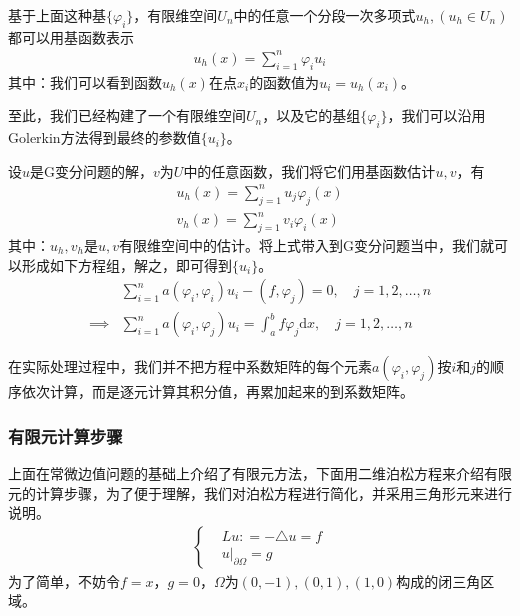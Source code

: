             \par
            基于上面这种基$\{\varphi _i\}$，有限维空间$U_n$中的任意一个分段一次多项式$u_h,(u_h \in U_n)$都可以用基函数表示
            \begin{align*}
                u_h(x) = \sum _{i = 1}^n \varphi_i u_i
            \end{align*}
            其中：我们可以看到函数$u_h(x)$在点$x_i$的函数值为$u_i = u_h(x_i)$。
            \par
            至此，我们已经构建了一个有限维空间$U_n$，以及它的基组$\{\varphi _i\}$，我们可以沿用Golerkin方法得到最终的参数值$\{u _i\}$。
            \par
            设$u$是G变分问题的解，$v$为$U$中的任意函数，我们将它们用基函数估计$u,v$，有
            \begin{align*}
                u_h(x) = \sum_{j = 1}^n u_j \varphi_j(x)\\
                v_h(x) = \sum_{j = 1}^n v_i \varphi_i(x)
            \end{align*}
            其中：$u_h,v_h$是$u,v$有限维空间中的估计。将上式带入到G变分问题当中，我们就可以形成如下方程组，解之，即可得到$\{u _i\}$。
            \begin{align*}
                            &\sum_{i = 1}^n a(\varphi_i,\varphi_i)u_i - (f,\varphi_j) = 0 ,\quad j = 1,2,\dots,n\\
                \implies {} &\sum_{i = 1}^n a(\varphi_i,\varphi_j)u_i = \int_a^bf \varphi_j \mathrm{d}x ,\quad j = 1,2,\dots,n
            \end{align*}
            \par
            在实际处理过程中，我们并不把方程中系数矩阵的每个元素$a(\varphi_i, \varphi_j)$按$i$和$j$的顺序依次计算，而是逐元计算其积分值，再累加起来的到系数矩阵。


        \subsubsection{有限元计算步骤}
            \label{subsubsec:有限元计算步骤}
            上面在常微边值问题的基础上介绍了有限元方法，下面用二维泊松方程来介绍有限元的计算步骤，为了便于理解，我们对泊松方程进行简化，并采用三角形元来进行说明。
            \begin{align}
                \label{有限元计算步骤示意的原方程}
                \left\{
                \begin{aligned}
                &Lu: = - \triangle u = f\\
                &u \bigl|_{\partial \Omega} = g
                \end{aligned}
                 \right.
            \end{align}
            为了简单，不妨令$f = x$，$g= 0$，$\Omega$为$(0,-1),(0,1),(1,0)$构成的闭三角区域。
